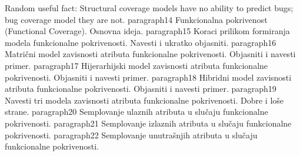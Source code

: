\indent *Random useful fact: Structural coverage models have no ability to predict bugs; bug coverage model they are not.
paragraph{14 Funkcionalna pokrivenost (Functional Coverage). Osnovna ideja.}
\indent 
paragraph{15 Koraci prilikom formiranja modela funkcionalne pokrivenosti. Navesti i ukratko objasniti.}
paragraph{16 Matrični model zavisnosti atributa funkcionalne pokrivenosti. Objasniti i navesti primer.}
paragraph{17 Hijerarhijski model zavisnosti atributa funkcionalne pokrivenosti. Objasniti i navesti primer.}
paragraph{18 Hibridni model zavisnosti atributa funkcionalne pokrivenosti. Objasniti i navesti primer.}
paragraph{19 Navesti tri modela zavisnosti atributa funkcionalne pokrivenosti. Dobre i loše strane.}
paragraph{20 Semplovanje ulaznih atributa u slučaju funkcionalne pokrivenosti.}
paragraph{21 Semplovanje izlaznih atributa u slučaju funkcionalne pokrivenosti.}
paragraph{22 Semplovanje unutrašnjih atributa u slučaju funkcionalne pokrivenosti.}
